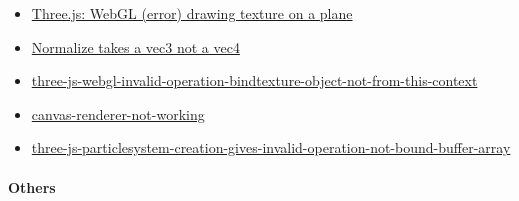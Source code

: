 \documentclass[]{article}
\begin{document}
\begin{itemize}
\itemsep1pt\parskip0pt
\item
  \href{http://stackoverflow.com/questions/24635753/three-js-webgl-error-drawing-texture-on-a-plane}{Three.js:
  WebGL (error) drawing texture on a plane}
\item
  \href{http://stackoverflow.com/questions/14842857/normalize-function-in-webgl-not-working-three-js}{Normalize
  takes a vec3 not a vec4}
\item
  \href{http://stackoverflow.com/questions/29059306/three-js-webgl-invalid-operation-bindtexture-object-not-from-this-context}{three-js-webgl-invalid-operation-bindtexture-object-not-from-this-context}
\item
  \href{http://stackoverflow.com/questions/30074972/canvas-renderer-not-working}{canvas-renderer-not-working}
\item
  \href{http://stackoverflow.com/questions/11359152/three-js-particlesystem-creation-gives-invalid-operation-not-bound-buffer-array}{three-js-particlesystem-creation-gives-invalid-operation-not-bound-buffer-array}
\end{itemize}

\paragraph{Others}\label{others}
\end{document}
